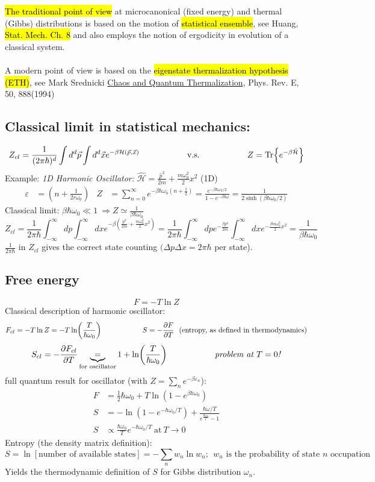 \documentclass[10pt]{article}
\newcommand{\Ham}{\hat{\mathcal{H}}}
\newcommand{\smallspace}{\hspace{2cm}}
\begin{document}
\hl{The traditional point of view} at microcanonical (fixed energy) and thermal (Gibbs) distributions is based on the motion of \hl{statistical ensemble}, see Huang, \hl{Stat. Mech. Ch. 8} and also employs the notion of ergodicity in evolution of a classical system. \\ \\
\noindent A modern point of view is based on the \hl{eigenstate thermalization hypothesis (ETH)}, see Mark Srednicki \href{https://arxiv.org/abs/cond-mat/9403051}{Chaos and Quantum Thermalization}, Phys. Rev. E, 50, 888(1994)

\subsection{Classical limit in statistical mechanics:}
$$
Z_{cl} = \frac{1}{(2\pi \hbar)^d}\int d^d\vec p \int d^d \vec x e^{-\beta \mathcal{H}(\vec p, \vec x)} \smallspace \text{v.s.} \smallspace Z = \Tr{e^{-\beta \Ham}}
$$
Example: \textit{1D Harmonic Oscillator:} $\Ham = \frac{\hat p^2}{2m} + \frac{m\omega_0^2}{2}x^2$ (1D)
\begin{align*}
    \varepsilon &= (n+\frac{1}{2r \omega_0}) & Z &= \sum_{n=0}^\infty e^{-\beta \hbar \omega_0(n+ \frac{1}{2})} = \frac{e^{-\beta\hbar \omega_0/2}}{1-e^{-\beta\hbar \omega}} = \frac{1}{2\sinh(\beta \hbar \omega_0 / 2)}
\end{align*}
Classical limit: $\beta \hbar \omega_0 \ll 1 \ \Rightarrow Z \simeq \frac{1}{\beta\hbar\omega_0}$
$$
Z_{cl} = \frac{1}{2\pi \hbar}\int_{-\infty}^\infty dp \int_{-\infty}^\infty dx e^{-\beta\left(\frac{p^2}{2m}+\frac{m\omega_0^2}{2}x^2\right)} = \frac{1}{2\pi \hbar} \int_{-\infty}^\infty dp e^{-\frac{\beta p^2}{2m}} \int_{-\infty}^\infty dx e^{-\frac{\beta m\omega_0^2}{2}x^2} = \frac{1}{\beta\hbar \omega_0}
$$
$\frac{1}{2\pi \hbar}$ in $Z_{cl}$ gives the correct state counting $(\Delta p \Delta x = 2\pi \hbar$ per state).

\subsection{Free energy}
    $$
F = -T\ln Z
    $$
    Classical description of harmonic oscillator:
    $$
F_{cl} = -T\ln Z = -T \ln (\frac{T}{\hbar \omega_0}) \smallspace S = -\pdv{F}{T} \ \ \text{(entropy, as defined in thermodynamics)}
    $$
    $$
S_{cl} = -\pdv{F_{cl}}{T} \underbrace{=}_{\text{for oscillator}} 1 + \ln(\frac{T}{\hbar\omega_0}) \smallspace \text{\textit{problem at $T = 0$!}}
    $$
full quantum result for oscillator (with $Z = \sum_n e^{-\beta \varepsilon_n}$):
\begin{align*}
    F &= \frac{1}{2}\hbar \omega_0 + T \ln(1-e^{\beta \hbar \omega_0}) \\
    S &= -\ln(1-e^{-\hbar \omega_0 / T}) + \frac{\hbar \omega/T}{e^{\frac{\hbar \omega_0}{T}}-1} \\
    S &\propto \frac{\hbar \omega_0}{T}e^{-\hbar \omega_0/T} \ \text{at} \ T \to 0
\end{align*}
Entropy (the density matrix definition):
$$
S = \ln [\text{number of available states}] = -\sum_n w_n \ln w_n; \ \ \text{$w_n$ is the probability of state $n$ occupation}
$$
Yields the thermodynamic definition of $S$ for Gibbs distribution $\omega_n$.
\end{document}
